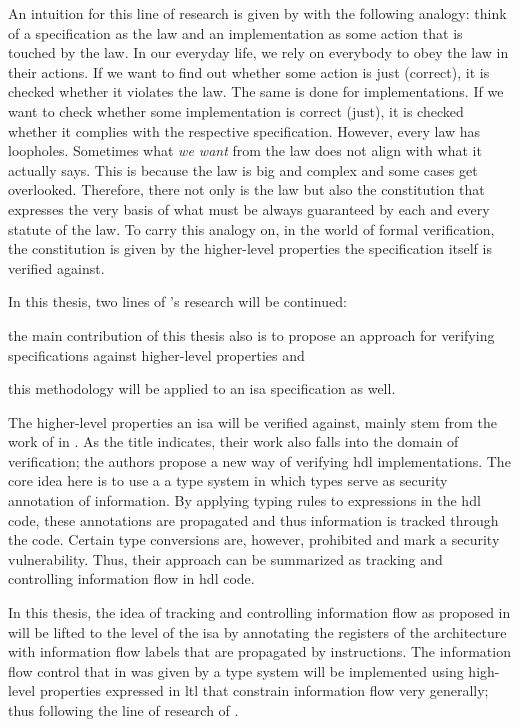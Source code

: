An intuition for this line of research is given by \citeauthor{Reid17} with the following analogy: think of a specification as the law and an implementation as some action that is touched by the law.
In our everyday life, we rely on everybody to obey the law in their actions.
If we want to find out whether some action is just (correct), it is checked whether it violates the law.
The same is done for implementations.
If we want to check whether some implementation is correct (just), it is checked whether it complies with the respective specification.
However, every law has loopholes.
Sometimes what \textit{we want} from the law does not align with what it actually says.
This is because the law is big and complex and some cases get overlooked.
Therefore, there not only is the law but also the constitution that expresses the very basis of what must be always guaranteed by each and every statute of the law.
To carry this analogy on, in the world of formal verification, the constitution is given by the higher-level properties the specification itself is verified against.

In this thesis, two lines of \citeauthor{Reid17}'s research will be continued: \begin{enumerate*}[label=\alph*)]
    \item the main contribution of this thesis also is to propose an approach for verifying specifications against higher-level properties and
    \item this methodology will be applied to an \gls{isa} specification as well.
\end{enumerate*}

The higher-level properties an \gls{isa} will be verified against, mainly stem from the work of \citeauthor{Ferraiuolo17} in  \cite{Ferraiuolo17}.
As the title indicates, their work also falls into the domain of verification; the authors propose a new way of verifying \gls{hdl} implementations.
The core idea here is to use a a type system in which types serve as security annotation of information.
By applying typing rules to expressions in the \gls{hdl} code, these annotations are propagated and thus information is tracked through the code.
Certain type conversions are, however, prohibited and mark a security vulnerability.
Thus, their approach can be summarized as tracking and controlling information flow in \gls{hdl} code.

In this thesis, the idea of tracking and controlling information flow as proposed in \cite{Ferraiuolo17} will be lifted to the level of the \gls{isa} by annotating the registers of the architecture with information flow labels that are propagated by instructions.
The information flow control that in \cite{Ferraiuolo17} was given by a type system will be implemented using high-level properties expressed in \gls{ltl} that constrain information flow very generally; thus following the line of research of \cite{Reid17}.

